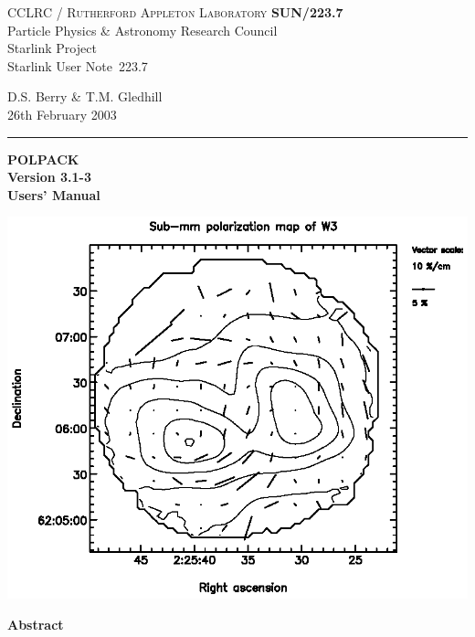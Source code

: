 \documentclass[twoside,11pt]{article}
\newcommand{\stardoccategory}  {Starlink User Note}
\newcommand{\stardocinitials}  {SUN}
\newcommand{\stardocnumber}    {223.7}
\newcommand{\stardocauthors}   {D.S. Berry \& T.M. Gledhill }
\newcommand{\stardocdate}      {26th February 2003}
\newcommand{\stardoctitle}     {POLPACK}
\newcommand{\stardocversion}   {Version 3.1-3}
\newcommand{\stardocmanual}    {Users' Manual}
\newcommand{\stardocname}{\stardocinitials /\stardocnumber}
\newenvironment{latexonly}{}{}
\renewcommand{\_}{\texttt{\symbol{95}}}
\begin{document}
\thispagestyle{empty}

\begin{latexonly}
   CCLRC / \textsc{Rutherford Appleton Laboratory} \hfill \textbf{\stardocname}\\
   {\large Particle Physics \& Astronomy Research Council}\\
   {\large Starlink Project\\}
   {\large \stardoccategory\ \stardocnumber}
   \begin{flushright}
   \stardocauthors\\
   \stardocdate
   \end{flushright}
   \vspace{-4mm}
   \rule{\textwidth}{0.5mm}
   \vspace{5mm}
   \begin{center}
   {\Huge\textbf{\stardoctitle \\ [2.5ex]}}
   {\LARGE\textbf{\stardocversion \\ [4ex]}}
   {\Huge\textbf{\stardocmanual}}
   \end{center}
   \vspace{5mm}

   \begin{center}
   \includegraphics[clip,scale=1.0]{sun223_figures/fig.eps}
   \end{center}

   \vspace{5mm}
   \begin{center}
      {\Large\textbf{Abstract}}
   \end{center}
\end{latexonly}
\end{document}
